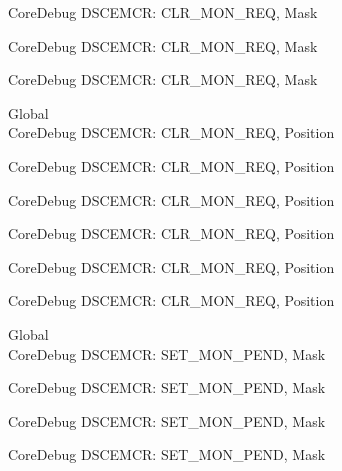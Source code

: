 \begin{DoxyRefList}
\label{deprecated__deprecated000750}%
%
Core\+Debug DSCEMCR\+: CLR\+\_\+\+MON\+\_\+\+REQ, Mask 

\label{deprecated__deprecated001201}%
%
Core\+Debug DSCEMCR\+: CLR\+\_\+\+MON\+\_\+\+REQ, Mask 

\label{deprecated__deprecated001303}%
%
Core\+Debug DSCEMCR\+: CLR\+\_\+\+MON\+\_\+\+REQ, Mask  
\item[Global \doxylink{group___c_m_s_i_s___s_c_b_ga1e2e3a310143f4663f1c415c03c3d535}{Core\+Debug\+\_\+\+DSCEMCR\+\_\+\+CLR\+\_\+\+MON\+\_\+\+REQ\+\_\+\+Pos} ]\hfill \\
\label{deprecated__deprecated000071}%
%
Core\+Debug DSCEMCR\+: CLR\+\_\+\+MON\+\_\+\+REQ, Position 

\label{deprecated__deprecated000522}%
%
Core\+Debug DSCEMCR\+: CLR\+\_\+\+MON\+\_\+\+REQ, Position 

\label{deprecated__deprecated000624}%
%
Core\+Debug DSCEMCR\+: CLR\+\_\+\+MON\+\_\+\+REQ, Position 

\label{deprecated__deprecated000749}%
%
Core\+Debug DSCEMCR\+: CLR\+\_\+\+MON\+\_\+\+REQ, Position 

\label{deprecated__deprecated001200}%
%
Core\+Debug DSCEMCR\+: CLR\+\_\+\+MON\+\_\+\+REQ, Position 

\label{deprecated__deprecated001302}%
%
Core\+Debug DSCEMCR\+: CLR\+\_\+\+MON\+\_\+\+REQ, Position  
\item[Global \doxylink{group___c_m_s_i_s___s_c_b_ga575045239507b73f338bcbb959ac6904}{Core\+Debug\+\_\+\+DSCEMCR\+\_\+\+SET\+\_\+\+MON\+\_\+\+PEND\+\_\+\+Msk} ]\hfill \\
\label{deprecated__deprecated000078}%
%
Core\+Debug DSCEMCR\+: SET\+\_\+\+MON\+\_\+\+PEND, Mask 

\label{deprecated__deprecated000529}%
%
Core\+Debug DSCEMCR\+: SET\+\_\+\+MON\+\_\+\+PEND, Mask 

\label{deprecated__deprecated000631}%
%
Core\+Debug DSCEMCR\+: SET\+\_\+\+MON\+\_\+\+PEND, Mask 

\label{deprecated__deprecated000756}%
%
Core\+Debug DSCEMCR\+: SET\+\_\+\+MON\+\_\+\+PEND, Mask 


\end{DoxyRefList}
